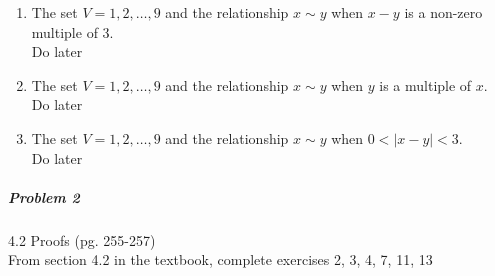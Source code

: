 \documentclass[11pt,a4paper]{article}
\begin{document}
\begin{enumerate}
            \begin{enumerate}
                \item The set $V={1,2,…,9}$ and the relationship $x\sim y$ when $x-y$ is a non-zero multiple of 3.\\
                    Do later
                \item The set $V={1,2,…,9}$ and the relationship $x\sim y$ when $y$ is a multiple of $x$.\\
                    Do later
                \item The set $V={1,2,…,9}$ and the relationship $x\sim y$ when $0<|x−y|<3$.\\
                    Do later

            \end{enumerate}
        \end{enumerate}
	
	\subparagraph{Problem 2} 4.2 Proofs (pg. 255-257) \\
	
		From section 4.2 in the textbook, complete exercises 2, 3, 4, 7, 11, 13
\end{document}
